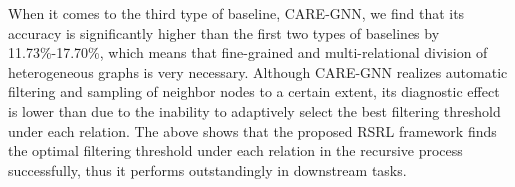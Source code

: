 When it comes to the third type of baseline, CARE-GNN, we find that its accuracy is significantly higher than the first two types of baselines by 11.73\%-17.70\%, which means that fine-grained and multi-relational division of heterogeneous graphs is very necessary.
Although CARE-GNN realizes automatic filtering and sampling of neighbor nodes to a certain extent, its diagnostic effect is lower than \RioGNN due to the inability to adaptively select the best filtering threshold under each relation. 
The above shows that the proposed RSRL framework finds the optimal filtering threshold under each relation in the recursive process successfully, thus it performs outstandingly in downstream tasks.





\begin{table}[t]
    \setlength{\abovecaptionskip}{0.cm}
    \setlength{\belowcaptionskip}{-0.cm}
    \caption{Diabetes Detection results () compared to the baselines.}\label{tab:diabetes_base}
    \centering
\end{table}
